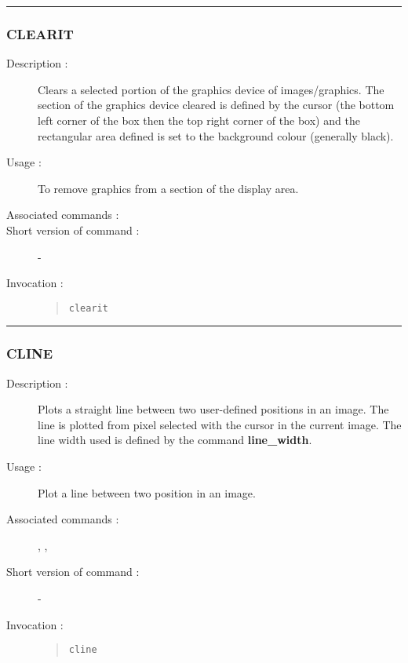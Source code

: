 \hrule
\subsubsection*{\label{CLEARIT}CLEARIT}

\begin{description}

\item[Description :] Clears a selected portion of the graphics device
of images/graphics. The section of the graphics device cleared is
defined by the cursor (the bottom left corner of the box then the top
right corner of the box) and the rectangular area defined is set to the
background colour (generally black).

\item[Usage :] To remove graphics from a section of the display area.
\item[Associated commands :] {\tt {}}
\item[Short version of command :] -
\item[Invocation :]

\begin{quote}{\tt  clearit }\end{quote}

\end{description}

\hrule
\subsubsection*{\label{CLINE}CLINE}

\begin{description}

\item[Description :] Plots a straight line between two user-defined
positions in an image.  The line is plotted from pixel selected with
the cursor in the current image.  The line width used is defined by the
command {\bf line\_width}.

\item[Usage :] Plot a line between two position in an image.
\item[Associated commands :] {\tt {}},
{\tt {}}, {\tt {}}
\item[Short version of command :] -
\item[Invocation :]

\begin{quote}{\tt  cline }\end{quote}

\end{description}

